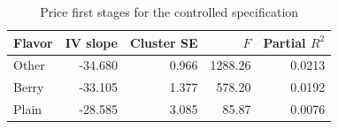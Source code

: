 \begin{table}[htbp]\centering\small
\caption{Price first stages for the controlled specification}
\label{tab:updated-first-stage}
\begin{tabular}{lrrrr}\toprule
Flavor & IV slope & Cluster SE & $F$ & Partial $R^2$\\\midrule
Other & -34.680 & 0.966 & 1288.26 & 0.0213 \\
Berry & -33.105 & 1.377 & 578.20 & 0.0192 \\
Plain & -28.585 & 3.085 & 85.87 & 0.0076 \\
\bottomrule\end{tabular}
\end{table}
